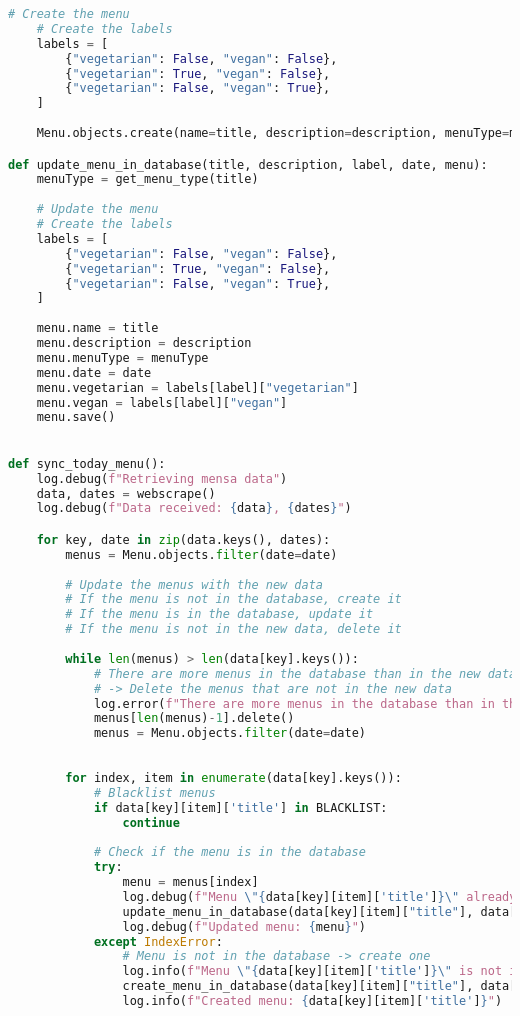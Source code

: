 \begin{lstlisting}[language=Python]
    # Create the menu
    # Create the labels
    labels = [
        {"vegetarian": False, "vegan": False},
        {"vegetarian": True, "vegan": False},
        {"vegetarian": False, "vegan": True},
    ]
    
    Menu.objects.create(name=title, description=description, menuType=menuType, date=date, **labels[label])

def update_menu_in_database(title, description, label, date, menu):
    menuType = get_menu_type(title)
    
    # Update the menu
    # Create the labels
    labels = [
        {"vegetarian": False, "vegan": False},
        {"vegetarian": True, "vegan": False},
        {"vegetarian": False, "vegan": True},
    ]
    
    menu.name = title
    menu.description = description
    menu.menuType = menuType
    menu.date = date
    menu.vegetarian = labels[label]["vegetarian"]
    menu.vegan = labels[label]["vegan"]
    menu.save()
    

def sync_today_menu():
    log.debug(f"Retrieving mensa data")
    data, dates = webscrape()
    log.debug(f"Data received: {data}, {dates}")

    for key, date in zip(data.keys(), dates):
        menus = Menu.objects.filter(date=date)
        
        # Update the menus with the new data
        # If the menu is not in the database, create it
        # If the menu is in the database, update it
        # If the menu is not in the new data, delete it
        
        while len(menus) > len(data[key].keys()):
            # There are more menus in the database than in the new data
            # -> Delete the menus that are not in the new data
            log.error(f"There are more menus in the database than in the new data")
            menus[len(menus)-1].delete()
            menus = Menu.objects.filter(date=date)
            
        
        for index, item in enumerate(data[key].keys()):
            # Blacklist menus
            if data[key][item]['title'] in BLACKLIST:
                continue
            
            # Check if the menu is in the database
            try:
                menu = menus[index]
                log.debug(f"Menu \"{data[key][item]['title']}\" already in database (DB: {menu})")
                update_menu_in_database(data[key][item]["title"], data[key][item]["description"], data[key][item]["label"], date, menu)  # Update the menu
                log.debug(f"Updated menu: {menu}")
            except IndexError:
                # Menu is not in the database -> create one
                log.info(f"Menu \"{data[key][item]['title']}\" is not in the database")
                create_menu_in_database(data[key][item]["title"], data[key][item]["description"], data[key][item]["label"], date)  # Create the menu
                log.info(f"Created menu: {data[key][item]['title']}")
        

\end{lstlisting}
